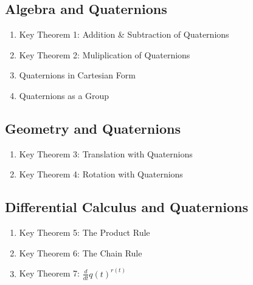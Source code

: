 \subsection{Algebra and Quaternions}
	\begin{enumerate}[label={(\alph*)}]
		\item Key Theorem 1: Addition \& Subtraction of Quaternions
		\item Key Theorem 2: Muliplication of Quaternions
		\item Quaternions in Cartesian Form
		\item Quaternions as a Group
	\end{enumerate}
\subsection{Geometry and Quaternions}
	\begin{enumerate}[label={(\alph*)}]
		\item Key Theorem 3: Translation with Quaternions
		\item Key Theorem 4: Rotation with Quaternions
	\end{enumerate}

\subsection{Differential Calculus and Quaternions}
	\begin{enumerate}[label={(\alph*)}]
		\item Key Theorem 5: The Product Rule
		\item Key Theorem 6: The Chain Rule
		\item Key Theorem 7: $\frac{d}{dt}q(t)^{r(t)}$
	\end{enumerate}
